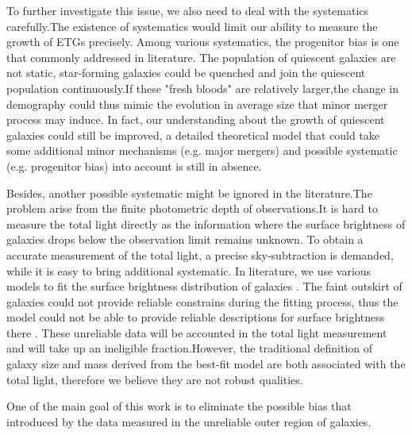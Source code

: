 \documentclass[fleqn,usenatbib]{mnras}
\begin{document}
\par To further investigate this issue, we also need to deal with the systematics carefully.The existence of systematics would limit our ability to measure the growth of ETGs precisely.
 Among various systematics, the progenitor bias is one that commonly addressed in literature. The population of quiescent galaxies are not static, star-forming galaxies could be quenched and join the quiescent population continuously.If these "fresh bloods" are relatively larger,the change in demography could thus mimic the evolution in average size that minor merger process may induce\citep{van_dokkum_1996,carolloNEWLYQUENCHEDGALAXIES2013, fagioliMinorMergersProgenitor2016, vandokkumMorphologicalEvolutionAges2001}.
In fact, our understanding about the growth of quiescent galaxies could still be improved, a detailed theoretical model that could take some additional minor mechanisms (e.g. major mergers) and possible systematic (e.g. progenitor bias) into account is still in absence.
\par Besides, another possible systematic might be ignored in the literature.The problem arise from the finite photometric depth of observations.It is hard to measure the total light directly \citep{tal_2011_faint} as the information where the surface brightness of galaxies drops below the observation limit remains unknown. To obtain a accurate measurement of the total light, a precise sky-subtraction is demanded, while it is easy to bring additional systematic. In literature, we use various models to fit the surface brightness distribution of galaxies . The faint outskirt of galaxies could not provide reliable constrains during the fitting process, thus the model could not be able to provide reliable descriptions for surface brightness there . These unreliable data will be accounted in the total light measurement and will take up an ineligible fraction\citep{Alessandro20}.However, the traditional definition of galaxy size and mass derived from the best-fit model are both associated with the total light, therefore we believe they are not robust qualities. 
\par One of the main goal of this work is to eliminate the possible bias that introduced by the data measured in the unreliable outer region of galaxies. 
\end{document}
